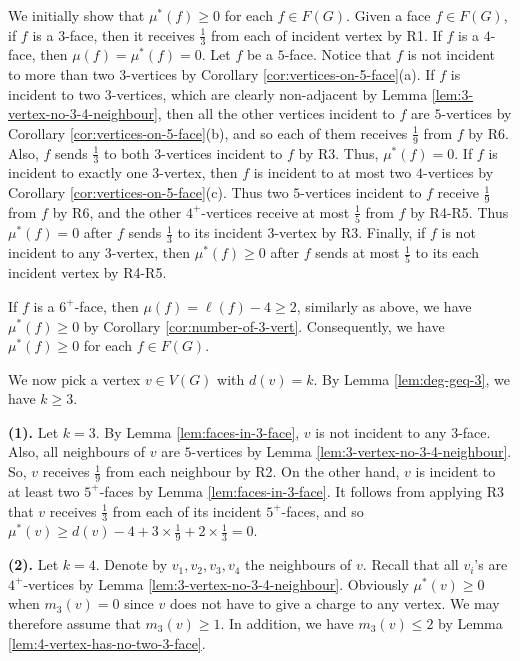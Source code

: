\documentclass[12pt, reqno]{amsart}
\theoremstyle{plain}
\theoremstyle{definition}
\numberwithin{equation}{section}
\begin{document}
We initially show that $\mu^*(f)\geq 0$ for each $f\in F(G)$. Given a face $f\in F(G)$, 
if $f$ is a $3$-face, then it receives $\frac{1}{3}$ from each of incident vertex by R1. 
If $f$ is a $4$-face, then $\mu(f)=\mu^*(f)= 0$.
Let $f$ be a $5$-face. Notice that $f$ is not incident to more than  two   $3$-vertices by Corollary \ref{cor:vertices-on-5-face}(a). If $f$ is incident to two $3$-vertices, which  are clearly non-adjacent by Lemma \ref{lem:3-vertex-no-3-4-neighbour}, then all the other vertices incident to $f$ are $5$-vertices by Corollary \ref{cor:vertices-on-5-face}(b), and so each of them receives  $\frac{1}{9}$ from $f$ by R6. Also, $f$ sends $\frac{1}{3}$ to both $3$-vertices incident to $f$ by R3. Thus, $\mu^*(f)= 0$. If $f$ is incident to exactly one $3$-vertex, then
$f$ is incident to at most two $4$-vertices by Corollary \ref{cor:vertices-on-5-face}(c). Thus two $5$-vertices incident to $f$ receive  $\frac{1}{9}$ from $f$ by R6, and the other $4^+$-vertices receive at most $\frac{1}{5}$ from $f$ by R4-R5. Thus $\mu^*(f)= 0$ after $f$ sends $\frac{1}{3}$ to its incident $3$-vertex by R3. Finally, if $f$ is not incident to any $3$-vertex, then  $\mu^*(f)\geq  0$ after $f$ sends at most $\frac{1}{5}$ to its  each incident vertex by R4-R5.


If $f$ is a $6^+$-face, then $\mu(f)=\ell(f)-4 \geq 2$, similarly as above, we have  $\mu^*(f)\geq 0$ by Corollary \ref{cor:number-of-3-vert}.
Consequently, we have $\mu^*(f)\geq 0$ for each $f\in F(G)$.  \medskip

We now pick a vertex $v\in V(G)$ with $d(v)=k$. By Lemma \ref{lem:deg-geq-3}, we have $k\geq 3$. \medskip


\textbf{(1).} Let $k=3$. By Lemma \ref{lem:faces-in-3-face}, $v$ is not incident to any $3$-face. Also,  all neighbours of $v$ are $5$-vertices  by Lemma \ref{lem:3-vertex-no-3-4-neighbour}. So, $v$ receives $\frac{1}{9}$ from each neighbour by R2. On the other hand, $v$ is incident to at least two $5^+$-faces by Lemma \ref{lem:faces-in-3-face}.  It follows from applying R3 that $v$ receives $\frac{1}{3}$  from  each of its incident $5^+$-faces, and so  $\mu^*(v)\geq  d(v)-4+ 3\times \frac{1}{9}+2\times \frac{1}{3}=0$. \medskip 


\textbf{(2).} Let $k=4$. Denote by $v_1,v_2,v_3, v_4$ the neighbours of $v$. Recall that all $v_i$'s are $4^+$-vertices by Lemma \ref{lem:3-vertex-no-3-4-neighbour}. Obviously $\mu^*(v) \geq 0$ when $m_3(v)=0$ since $v$ does not have to give a charge to any vertex. We may therefore assume that  $m_3(v)\geq 1$. In addition, we have $m_3(v)\leq 2$ by Lemma \ref{lem:4-vertex-has-no-two-3-face}. 
\end{document}
